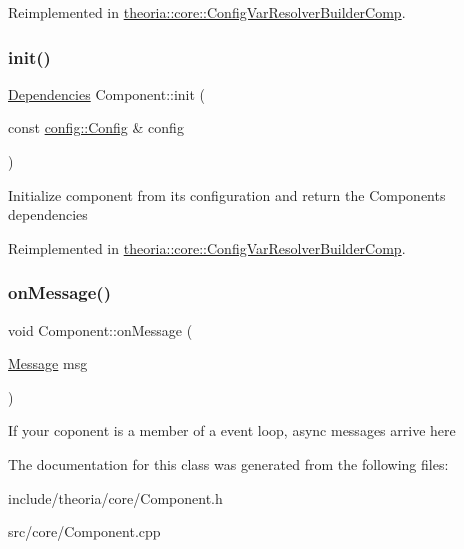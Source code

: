 Reimplemented in \hyperlink{classtheoria_1_1core_1_1ConfigVarResolverBuilderComp_ac1e585a908c7e0fa7db4bdf0a8b514bb}{theoria\+::core\+::\+Config\+Var\+Resolver\+Builder\+Comp}.

\mbox{\label{classtheoria_1_1core_1_1Component_a7ed45f6e38442a40666ae4556f794f7d}} 
\subsubsection{\texorpdfstring{init()}{init()}}
{\footnotesize\ttfamily \hyperlink{classtheoria_1_1core_1_1Dependencies}{Dependencies} Component\+::init (\begin{DoxyParamCaption}\item[{const \hyperlink{classtheoria_1_1config_1_1Config}{config\+::\+Config} \&}]{config }\end{DoxyParamCaption})\hspace{0.3cm}{\ttfamily [virtual]}}

Initialize component from its configuration and return the Components dependencies 

Reimplemented in \hyperlink{classtheoria_1_1core_1_1ConfigVarResolverBuilderComp_aadf94c8b3d765667eaf9d7c91ac65342}{theoria\+::core\+::\+Config\+Var\+Resolver\+Builder\+Comp}.

\mbox{\label{classtheoria_1_1core_1_1Component_a94991dc5bdf509df6d35bb218e4880eb}} 
\subsubsection{\texorpdfstring{on\+Message()}{onMessage()}}
{\footnotesize\ttfamily void Component\+::on\+Message (\begin{DoxyParamCaption}\item[{\hyperlink{classtheoria_1_1core_1_1Message}{Message}}]{msg }\end{DoxyParamCaption})\hspace{0.3cm}{\ttfamily [virtual]}}

If your coponent is a member of a event loop, async messages arrive here 

The documentation for this class was generated from the following files\+:\begin{DoxyCompactItemize}
\item 
include/theoria/core/Component.\+h\item 
src/core/Component.\+cpp\end{DoxyCompactItemize}
